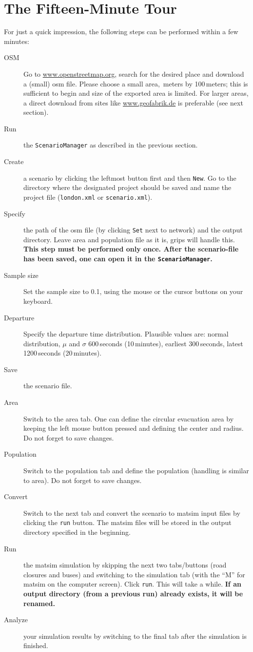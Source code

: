 \section{The Fifteen-Minute Tour}
\label{evac:section:fifteenminute}
For just a quick impression, the following steps can be performed within a few minutes:
\begin{description}
\item[OSM] Go to \url{www.openstreetmap.org}, search for the desired place and download a (small) \gls{osm} file. Please choose a small area, \,meters by 100\,meters; this is sufficient to begin and size of the exported area is limited. For larger areas, a direct download from sites like \url{www.geofabrik.de} is preferable (see next section).
\item[Run] the \lstinline|ScenarioManager| as described in the previous section.
\item[Create] a scenario by clicking the leftmost button first and then \lstinline|New|. Go to the directory where the designated project should be saved and name the project file (\eg \lstinline|london.xml| or \lstinline|scenario.xml|).
\item[Specify] the path of the \gls{osm} file (by clicking \lstinline|Set| next to network) and the output directory. Leave area and population file as it is, \gls{grips} will handle this.
\textbf{This step must be performed only once. After the scenario-file has been saved, one can open it in the \lstinline|ScenarioManager|.}
\item[Sample size] Set the sample size to 0.1, using the mouse or the cursor buttons on your keyboard.
\item[Departure] Specify the departure time distribution. Plausible values are: normal distribution, $\mu$ and $\sigma$ 600\,seconds (10\,minutes), earliest 300\,seconds, latest 1200\,seconds (20\,minutes).
\item[Save] the scenario file.
\item[Area] Switch to the area tab. One can define the circular evacuation area by keeping the left mouse button pressed and defining the center and radius. Do not forget to save changes.
\item[Population] Switch to the population tab and define the population (handling is similar to area). Do not forget to save changes.
\item[Convert] Switch to the next tab and convert the scenario to \gls{matsim} input files by clicking the \lstinline|run| button. The \gls{matsim} files will be stored in the output directory specified in the beginning.
\item[Run] the \gls{matsim} simulation by skipping the next two tabs/buttons (road closures and buses) and switching to the simulation tab (with the 
 ``M'' for \gls{matsim} on the computer screen). Click \lstinline|run|. This will take a while.
\textbf{If an output directory (\eg from a previous run) already exists, it will be renamed.}
\item[Analyze] your simulation results by switching to the final tab after the simulation is finished.

\end{description}

